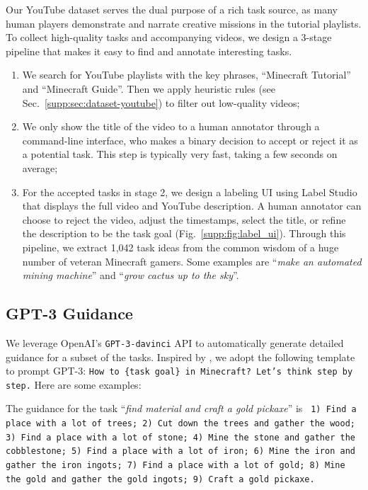 
Our YouTube dataset serves the dual purpose of a rich task source, as many human players demonstrate and narrate creative missions in the tutorial playlists. To collect high-quality tasks and accompanying videos, we design a 3-stage pipeline that makes it easy to find and annotate interesting tasks. 
\begin{enumerate}[label=Stage \arabic*:]
    \item We search for YouTube playlists with the key phrases, ``Minecraft Tutorial'' and ``Minecraft Guide''. Then we apply heuristic rules (see Sec.~\ref{supp:sec:dataset-youtube}) to filter out low-quality videos;
    \item We only show the title of the video to a human annotator through a command-line interface, who makes a binary decision to accept or reject it as a potential task. This step is typically very fast, taking a few seconds on average;
    \item For the accepted tasks in stage 2, we design a labeling UI using Label Studio~\cite{labelstudio} that displays the full video and YouTube description. A human annotator can choose to reject the video, adjust the timestamps, select the title, or refine the description to be the task goal (Fig.~\ref{supp:fig:label_ui}). Through this pipeline, we extract 1,042 task ideas from the common wisdom of a huge number of veteran Minecraft gamers. Some examples are ``\textit{make an automated mining machine}'' and ``\textit{grow cactus up to the sky}''.  
\end{enumerate} 


\subsection{GPT-3 Guidance}

We leverage OpenAI's \texttt{GPT-3-davinci} API to automatically generate detailed guidance for a subset of the tasks. Inspired by \cite{kojima2022large}, we adopt the following template to prompt GPT-3: \texttt{How to \{task goal\} in Minecraft? Let's think step by step.} Here are some examples:

The guidance for the task ``\textit{find material and craft a gold pickaxe}'' is \texttt{
1) Find a place with a lot of trees; 
2) Cut down the trees and gather the wood; 
3) Find a place with a lot of stone; 
4) Mine the stone and gather the cobblestone; 
5) Find a place with a lot of iron; 
6) Mine the iron and gather the iron ingots;
7) Find a place with a lot of gold;
8) Mine the gold and gather the gold ingots; 
9) Craft a gold pickaxe.
}

